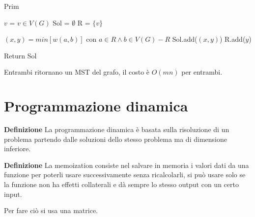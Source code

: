 \documentclass{article}
\begin{document}
\begin{algorithm}[ht]
    \caption{Prim}
    \begin{algorithmic}

    \State $v$ = $v\in V(G)$
    \State Sol = $\emptyset$
    \State R = $\{v\}$


        \State $(x,y)=min[w(a,b)]$ con $a\in R\wedge b\in V(G)-R$
        \State Sol.add($(x,y)$)
        \State R.add($y$)
            
    \EndWhile

    \State Return Sol
        
    \end{algorithmic}
\end{algorithm}

\noindent Entrambi ritornano un MST del grafo, il costo è $O(mn)$ per entrambi.\newline

\newpage

\section{Programmazione dinamica}

\textbf{Definizione} La programmazione dinamica è basata sulla risoluzione
di un problema partendo dalle soluzioni dello stesso problema ma di dimensione inferiore.\newline

\noindent\textbf{Definizione} La memoization consiste nel salvare in memoria i valori dati da una funzione per poterli usare successivamente senza ricalcolarli, si può usare solo se la funzione non ha effetti collaterali e dà sempre lo stesso output con un certo input.\newline

\noindent Per fare ciò si usa una matrice.\newline
\end{document}

